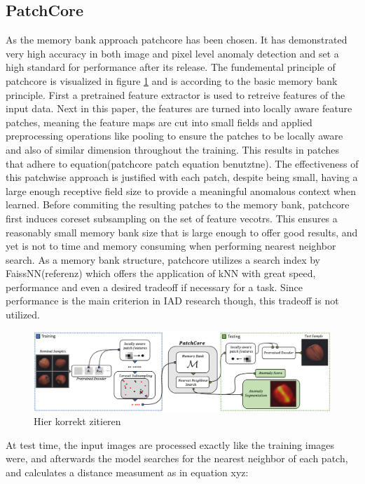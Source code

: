 \subsection{PatchCore}
\label{subsec:patchcore}
As the memory bank approach patchcore \cite{patchCore2022} has been chosen. It has demonstrated very high accuracy in both image and pixel level anomaly detection and set a high standard for 
performance after its release. The fundemental principle of patchcore is visualized in figure \ref{fig:patchcorearchitecture} and is according to the basic memory bank principle. First a pretrained feature extractor is used 
to retreive features of the input data. Next in this paper, the features are turned into locally aware feature patches, meaning the feature maps are cut into small fields and applied preprocessing operations like pooling to ensure 
the patches to be locally aware and also of similar dimension throughout the training. This results in patches that adhere to equation(patchcore patch equation benutztne). The effectiveness of this patchwise approach is justified with each patch, despite being small, having a large enough receptive field size to provide a meaningful anomalous context when learned. 
Before commiting the resulting patches to the memory bank, patchcore first induces coreset subsampling on the set of feature vecotrs. This ensures a reasonably small memory bank size that is 
large enough to offer good results, and yet is not to time and memory consuming when performing nearest neighbor search. As a memory bank structure, patchcore utilizes a search index by FaissNN(referenz) 
which offers the application of kNN with great speed, performance and even a desired tradeoff if necessary for a task. Since performance is the main criterion in IAD research though, this tradeoff is not 
utilized. 

\begin{figure}[ht]
    \centering
    \includegraphics[width=\textwidth]{figures/pathcore_architecture.png}
    \caption{Hier korrekt zitieren}
    \label{fig:patchcorearchitecture}
\end{figure}

At test time, the input images are processed exactly like the training images were, and afterwards the model searches for the nearest neighbor of each patch, and calculates a distance measument as 
in equation xyz: %

